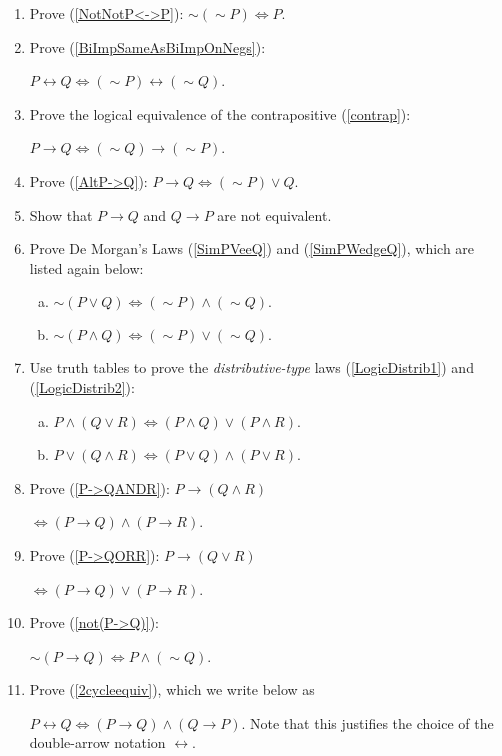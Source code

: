 \bigskip
\begin{multicols}{2}
\begin{enumerate}
\item Prove (\ref{NotNotP<->P}): $\sim(\sim P)\iff P$.
\item Prove (\ref{BiImpSameAsBiImpOnNegs}):

$P\longleftrightarrow Q\iff
(\sim P)\longleftrightarrow(\sim Q)
$.
\item Prove the logical equivalence of the 
contrapositive {\rm(\ref{contrap}):} 

$P\longrightarrow Q\iff (\sim Q)\longrightarrow(\sim P)$.
\item Prove (\ref{AltP->Q}):
$P\longrightarrow Q\iff(\sim P)\vee Q$.
\item Show that $P\longrightarrow Q$ and $Q\longrightarrow P$ 
are not equivalent.
\item Prove
De Morgan's Laws (\ref{SimPVeeQ})
and (\ref{SimPWedgeQ}), which are listed again below:
 \begin{enumerate}[(a)]
 \item $\sim(P\vee Q)\iff(\sim P)\wedge(\sim Q).$
 \item $\sim(P\wedge Q)\iff(\sim P)\vee(\sim Q).$
 \end{enumerate}
\item Use truth tables to prove the
{\it distributive-type} laws (\ref{LogicDistrib1}) and
(\ref{LogicDistrib2}):
\begin{enumerate}[(a)]
\item $P\wedge(Q\vee R)\iff(P\wedge Q)\vee(P\wedge R)$.
\item $P\vee(Q\wedge R)\iff(P\vee Q)\wedge(P\vee R)$.
\end{enumerate}
\item Prove (\ref{P->QANDR}):
$P\longrightarrow(Q\wedge R)$

$\iff
(P\longrightarrow Q)\wedge(P\longrightarrow R)$.

\item Prove (\ref{P->QORR}):
$P\longrightarrow(Q\vee R)$

$\iff (P\longrightarrow Q)\vee(P\longrightarrow R)$.

\item Prove (\ref{not(P->Q)}):

$\sim(P\longrightarrow Q)\iff P\wedge (\sim Q)$.
\item Prove (\ref{2cycleequiv}), which we write below as

$P\longleftrightarrow Q\iff
(P\longrightarrow Q)\wedge(Q\longrightarrow P)$.
\newline
Note that this justifies the choice of the double-arrow
notation $\longleftrightarrow$.


\end{enumerate}
\end{multicols}
